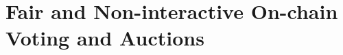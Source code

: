 \chapter[Fair and Non-interactive On-chain Voting and Auctions]{Fair and Non-interactive On-chain Voting and Auctions\footnotemarkCh}\label{sec:cicada}
\minitoc







% 


% 


